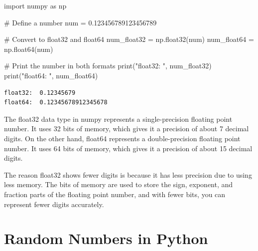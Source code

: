\documentclass[
  letterpaper,
  DIV=11,
  numbers=noendperiod]{scrreprt}
\newenvironment{Shaded}{\begin{snugshade}}{\end{snugshade}}
\newcommand{\BuiltInTok}[1]{\textcolor[rgb]{0.00,0.23,0.31}{#1}}
\newcommand{\CommentTok}[1]{\textcolor[rgb]{0.37,0.37,0.37}{#1}}
\newcommand{\FloatTok}[1]{\textcolor[rgb]{0.68,0.00,0.00}{#1}}
\newcommand{\ImportTok}[1]{\textcolor[rgb]{0.00,0.46,0.62}{#1}}
\newcommand{\NormalTok}[1]{\textcolor[rgb]{0.00,0.23,0.31}{#1}}
\newcommand{\OperatorTok}[1]{\textcolor[rgb]{0.37,0.37,0.37}{#1}}
\newcommand{\StringTok}[1]{\textcolor[rgb]{0.13,0.47,0.30}{#1}}
\begin{document}
\begin{tcolorbox}[enhanced jigsaw, opacityback=0, left=2mm, title=\textcolor{quarto-callout-note-color}{\faInfo}\hspace{0.5em}{Example: 32 versus 64 bit}, bottomrule=.15mm, titlerule=0mm, arc=.35mm, leftrule=.75mm, colbacktitle=quarto-callout-note-color!10!white, bottomtitle=1mm, opacitybacktitle=0.6, coltitle=black, colframe=quarto-callout-note-color-frame, toprule=.15mm, breakable, colback=white, toptitle=1mm, rightrule=.15mm]

\begin{Shaded}
\begin{Highlighting}[]
\ImportTok{import}\NormalTok{ numpy }\ImportTok{as}\NormalTok{ np}

\CommentTok{\# Define a number}
\NormalTok{num }\OperatorTok{=} \FloatTok{0.123456789123456789}

\CommentTok{\# Convert to float32 and float64}
\NormalTok{num\_float32 }\OperatorTok{=}\NormalTok{ np.float32(num)}
\NormalTok{num\_float64 }\OperatorTok{=}\NormalTok{ np.float64(num)}

\CommentTok{\# Print the number in both formats}
\BuiltInTok{print}\NormalTok{(}\StringTok{"float32: "}\NormalTok{, num\_float32)}
\BuiltInTok{print}\NormalTok{(}\StringTok{"float64: "}\NormalTok{, num\_float64)}
\end{Highlighting}
\end{Shaded}

\begin{verbatim}
float32:  0.12345679
float64:  0.12345678912345678
\end{verbatim}

\end{tcolorbox}

The float32 data type in numpy represents a single-precision floating
point number. It uses 32 bits of memory, which gives it a precision of
about 7 decimal digits. On the other hand, float64 represents a
double-precision floating point number. It uses 64 bits of memory, which
gives it a precision of about 15 decimal digits.

The reason float32 shows fewer digits is because it has less precision
due to using less memory. The bits of memory are used to store the sign,
exponent, and fraction parts of the floating point number, and with
fewer bits, you can represent fewer digits accurately.

\hypertarget{random-numbers-in-python}{%
\section{Random Numbers in Python}\label{random-numbers-in-python}}
\end{document}
